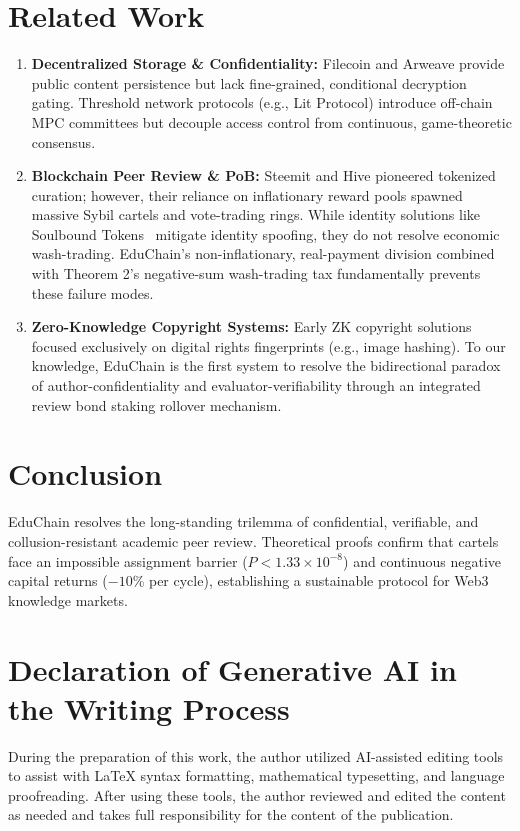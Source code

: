 \documentclass[conference,10pt]{IEEEtran}
\begin{document}
\section{Related Work}
\begin{enumerate}
    \item \textbf{Decentralized Storage \& Confidentiality:} Filecoin and Arweave provide public content persistence but lack fine-grained, conditional decryption gating. Threshold network protocols (e.g., Lit Protocol) introduce off-chain MPC committees but decouple access control from continuous, game-theoretic consensus.
    \item \textbf{Blockchain Peer Review \& PoB:} Steemit and Hive pioneered tokenized curation; however, their reliance on inflationary reward pools spawned massive Sybil cartels and vote-trading rings. While identity solutions like Soulbound Tokens~\cite{buterin2022soulbound} mitigate identity spoofing, they do not resolve economic wash-trading. EduChain's non-inflationary, real-payment division combined with Theorem 2's negative-sum wash-trading tax fundamentally prevents these failure modes.
    \item \textbf{Zero-Knowledge Copyright Systems:} Early ZK copyright solutions focused exclusively on digital rights fingerprints (e.g., image hashing). To our knowledge, EduChain is the first system to resolve the bidirectional paradox of author-confidentiality and evaluator-verifiability through an integrated review bond staking rollover mechanism.
\end{enumerate}

\section{Conclusion}
EduChain resolves the long-standing trilemma of confidential, verifiable, and collusion-resistant academic peer review. Theoretical proofs confirm that cartels face an impossible assignment barrier ($P < 1.33 \times 10^{-8}$) and continuous negative capital returns ($-10\%$ per cycle), establishing a sustainable protocol for Web3 knowledge markets.

\section*{Declaration of Generative AI in the Writing Process}
During the preparation of this work, the author utilized AI-assisted editing tools to assist with LaTeX syntax formatting, mathematical typesetting, and language proofreading. After using these tools, the author reviewed and edited the content as needed and takes full responsibility for the content of the publication.
\end{document}
